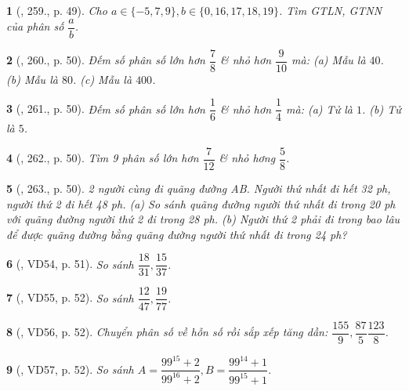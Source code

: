 \documentclass{article}
\newtheorem{baitoan}{}
\begin{document}
\begin{baitoan}[\cite{Tuyen_Toan_6}, 259., p. 49]
	Cho $a\in\{-5,7,9\},b\in\{0,16,17,18,19\}$. Tìm {\rm GTLN, GTNN} của phân số $\dfrac{a}{b}$.
\end{baitoan}

\begin{baitoan}[\cite{Tuyen_Toan_6}, 260., p. 50]
	Đếm số phân số lớn hơn $\dfrac{7}{8}$ \& nhỏ hơn $\dfrac{9}{10}$ mà: (a) Mẫu là $40$. (b) Mẫu là $80$. (c) Mẫu là $400$.
\end{baitoan}

\begin{baitoan}[\cite{Tuyen_Toan_6}, 261., p. 50]
	Đếm số phân số lớn hơn $\dfrac{1}{6}$ \& nhỏ hơn $\dfrac{1}{4}$ mà: (a) Tử là $1$. (b) Tử là $5$.
\end{baitoan}

\begin{baitoan}[\cite{Tuyen_Toan_6}, 262., p. 50]
	Tìm 9 phân số lớn hơn $\dfrac{7}{12}$ \& nhỏ hơng $\dfrac{5}{8}$.
\end{baitoan}

\begin{baitoan}[\cite{Tuyen_Toan_6}, 263., p. 50]
	2 người cùng đi quãng đường AB. Người thứ nhất đi hết {\rm32 ph}, người thứ 2 đi hết {\rm48 ph}. (a) So sánh quãng đường người thứ nhất đi trong {\rm20 ph} với quãng đường người thứ 2 đi trong {\rm28 ph}. (b) Người thứ 2 phải đi trong bao lâu để được quãng đường bằng quãng đường người thứ nhất đi trong {\rm24 ph}?
\end{baitoan}

\begin{baitoan}[\cite{Tuyen_Toan_6}, VD54, p. 51]
	So sánh $\dfrac{18}{31},\dfrac{15}{37}$.
\end{baitoan}

\begin{baitoan}[\cite{Tuyen_Toan_6}, VD55, p. 52]
	So sánh $\dfrac{12}{47},\dfrac{19}{77}$.
\end{baitoan}

\begin{baitoan}[\cite{Tuyen_Toan_6}, VD56, p. 52]
	Chuyển phân số về hỗn số rồi sắp xếp tăng dần: $\dfrac{155}{9},\dfrac{87}{5}\dfrac{123}{8}$.
\end{baitoan}

\begin{baitoan}[\cite{Tuyen_Toan_6}, VD57, p. 52]
	So sánh $A = \dfrac{99^{15} + 2}{99^{16} + 2},B = \dfrac{99^{14} + 1}{99^{15} + 1}$.
\end{baitoan}
\end{document}
